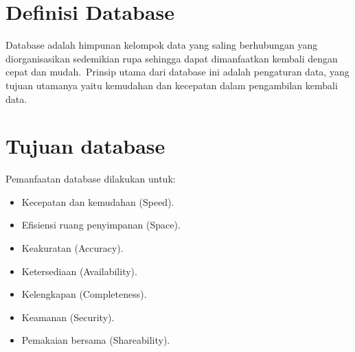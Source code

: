 \section{Definisi Database}
Database adalah himpunan kelompok data yang saling berhubungan yang diorganisasikan sedemikian rupa sehingga dapat dimanfaatkan kembali dengan cepat dan mudah. Prinsip utama dari database ini adalah pengaturan data, yang tujuan utamanya yaitu kemudahan dan kecepatan dalam pengambilan kembali data.

\section{Tujuan database}
Pemanfaatan database dilakukan untuk:
\begin{itemize}
	\item Kecepatan dan kemudahan (Speed).
	\item Efisiensi ruang penyimpanan (Space).
	\item Keakuratan (Accuracy).
	\item Ketersediaan (Availability).
	\item Kelengkapan (Completeness).
	\item Keamanan (Security).
	\item Pemakaian bersama (Shareability).
\end{itemize}


